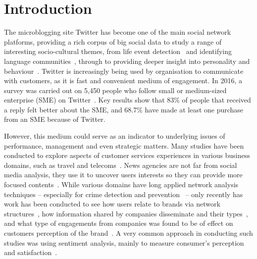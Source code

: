 \documentclass[sigconf]{acmart}
\begin{document}

\maketitle

\section{Introduction}\label{intro}

The microblogging site Twitter has become one of the main social
network platforms, providing a rich corpus of big social data to study
a range of interesting socio-cultural themes, from life event
detection~\cite{blamey-et-al-2013} and identifying language
communities~\cite{albishry-et-al:iccci2017}, through to providing
deeper insight into personality and
behaviour~\cite{mostafa-et-al-ai2016}. Twitter is increasingly being
used by organisation to communicate with customers, as it is fast and
convenient medium of engagement. In 2016, a survey was carried out on
5,450 people who follow small or medium-sized enterprise (SME) on
Twitter~\cite{Twitter2016}. Key results show that 83\% of people that
received a reply felt better about the SME, and 68.7\% have made at
least one purchase from an SME because of Twitter.

However, this medium could serve as an indicator to underlying issues
of performance, management and even strategic matters. Many studies
have been conducted to explore aspects of customer services
experiences in various business domains, such as travel and
telecoms~\cite{Shakeel2017,Zhang2016,Wattimena2017,Guercini2014,Khatoon2017}.
News agencies are not far from social media analysis, they use it to
uncover users interests so they can provide more focused
contents~\cite{Nigam2016}. While various domains have long applied
network analysis techniques -- especially for crime detection and
prevention~\cite{oatley+crick:2015,oatley-et-al:dasc2015} -- only
recently has work has been conducted to see how users relate to brands
via network structures~\cite{Cutler2017}, how information shared by
companies disseminate and their types~\cite{Piccialli2017}, and what
type of engagements from companies was found to be of effect on
customers perception of the brand~\cite{Ibrahim2017}. A very common
approach in conducting such studies was using sentiment analysis,
mainly to measure consumer's perception and
satisfaction~\cite{Zhang2016,Al-Hussaini2017}.
\end{document}
